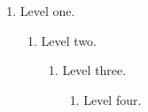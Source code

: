 \documentclass{article}
\begin{document}
\begin{enumerate}
  \item Level one.
  \begin{enumerate}
    \item Level two.
    \begin{enumerate}
      \item Level three.
      \begin{enumerate}
        \item Level four.
      \end{enumerate}
    \end{enumerate}
  \end{enumerate}
\end{enumerate}
\end{document}
